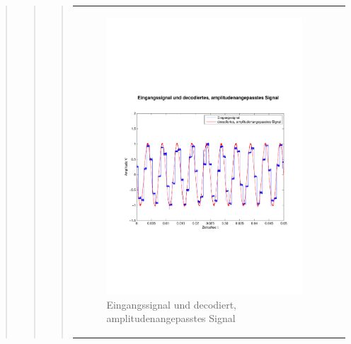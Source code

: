 \begin{quote}
\begin{quote}
\begin{quote}
            \begin{center}
                \begin{tabular}{ll}
                
                \hspace{-4cm}
                    \begin{minipage}{0.6\textwidth}
                        \begin{figure}[H]
                            \includegraphics[scale=0.4, trim = 0.8cm 7cm 0.8cm
                            7.5cm, clip]
                            {./Bilder/sin8_Eingang_vs_DecodiertAmpl-angepasst}
                              \caption{Eingangssignal und decodiert, \newline
                              amplitudenangepasstes Signal}
                              \label{sin8_dec_I}
                        \end{figure}
                    \end{minipage}
                    

\end{tabular}
\end{center}
\end{quote}
\end{quote}
\end{quote}

